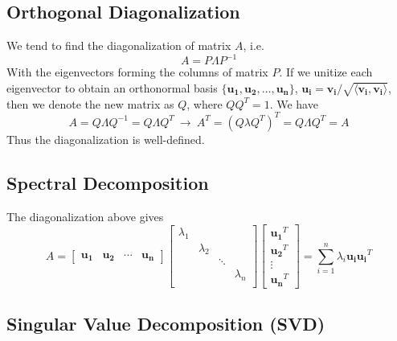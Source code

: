 \documentclass[11pt]{article}
\begin{document}
\subsection{Orthogonal Diagonalization}
We tend to find the diagonalization of matrix $A$, i.e.
\begin{equation}
    A = P\Lambda P^{-1}
\end{equation}
With the eigenvectors forming the columns of matrix $P$. If we unitize each eigenvector to obtain an orthonormal basis $\{\bm{u_1}, \bm{u_2}, \dots, \bm{u_n} \}$, $\bm{u_i} = \bm{v_i} / \sqrt{\langle \bm{v_i},\bm{v_i} \rangle}$, then we denote the new matrix as $Q$, where $QQ^T = 1$. We have
\begin{equation}
    \boxed{A = Q\Lambda Q^{-1} = Q\Lambda Q^T}~\rightarrow~A^T = (Q\lambda Q^T)^T = Q\Lambda Q^T = A
\end{equation}
Thus the diagonalization is well-defined.
\subsection{Spectral Decomposition}
The diagonalization above gives
\begin{equation}
    A = \begin{bmatrix}
    \bm{u_1} & \bm{u_2} & \cdots & \bm{u_n}
    \end{bmatrix} \begin{bmatrix}
    \lambda_1 & & & \\ & \lambda_2 & &  \\ & & \ddots & \\ & & & \lambda_n \\
    \end{bmatrix} \begin{bmatrix}
    \bm{u_1}^T \\ \bm{u_2}^T \\ \vdots \\ \bm{u_n}^T
    \end{bmatrix} = \sum_{i=1}^n \lambda_i \bm{u_i} \bm{u_i}^T
\end{equation}
\subsection{Singular Value Decomposition (SVD)}
\end{document}
